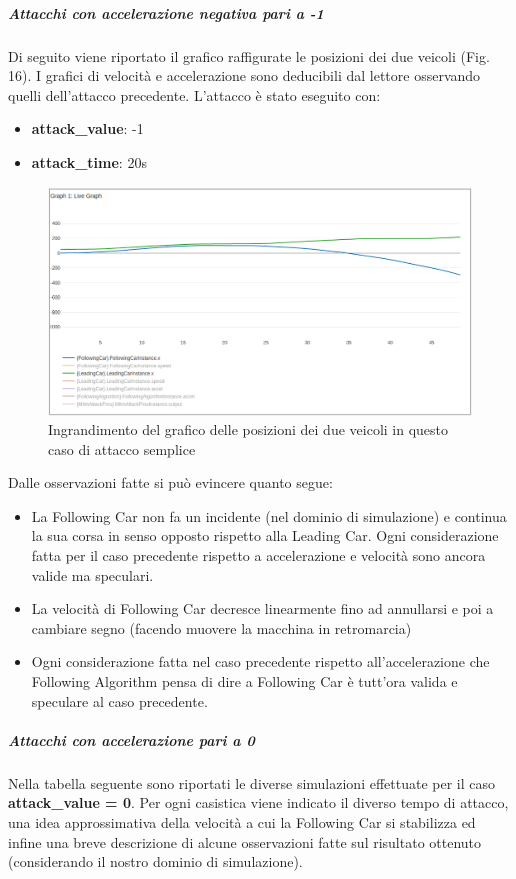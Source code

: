 \subparagraph{Attacchi con accelerazione negativa pari a -1}
Di seguito viene riportato il grafico raffigurate le posizioni dei due veicoli (Fig. 16). I grafici di velocità e accelerazione sono deducibili dal lettore osservando quelli dell'attacco precedente.
L'attacco è stato eseguito con:
\begin{itemize}
	\item \textbf{attack\_value}: -1
	\item \textbf{attack\_time}: 20s
\end{itemize}
\begin{figure}[H]
	\centering
	\includegraphics[width=\textwidth]{img/AttackAccel-1XZoomed.png}
	\caption{Ingrandimento del grafico delle posizioni dei due veicoli in questo caso di attacco semplice}
\end{figure}

Dalle osservazioni fatte si può evincere quanto segue:
\begin{itemize}
	\item La Following Car non fa un incidente (nel dominio di simulazione) e continua la sua corsa in senso opposto rispetto alla Leading Car. Ogni considerazione fatta per il caso precedente rispetto a accelerazione e velocità sono ancora valide ma speculari.
	\item La velocità di Following Car decresce linearmente fino ad annullarsi e poi a cambiare segno (facendo muovere la macchina in retromarcia)
	\item Ogni considerazione fatta nel caso precedente rispetto all'accelerazione che Following Algorithm pensa di dire a Following  Car è tutt'ora valida e speculare al caso precedente.
\end{itemize}

\subparagraph{Attacchi con accelerazione pari a 0}
Nella tabella seguente sono riportati le diverse simulazioni effettuate per il caso \textbf{attack\_value = 0}. Per ogni casistica viene indicato il diverso tempo di attacco, una idea approssimativa della velocità a cui la Following Car si stabilizza ed infine una breve descrizione di alcune osservazioni fatte sul risultato ottenuto (considerando il nostro dominio di simulazione).

